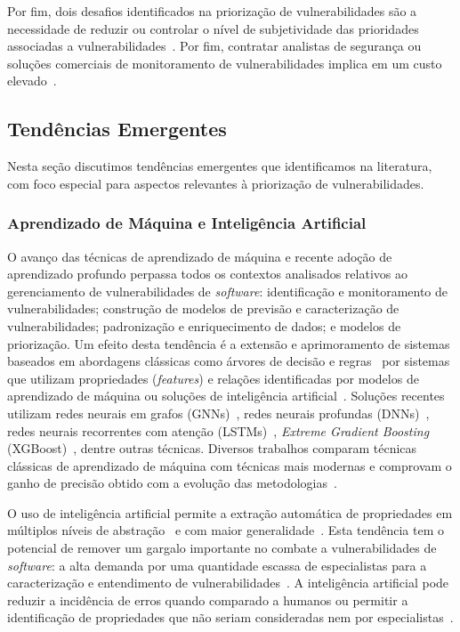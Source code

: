Por fim, dois desafios identificados na priorização de vulnerabilidades são a necessidade de reduzir ou controlar o nível de subjetividade das prioridades associadas a vulnerabilidades~\cite{stergiopoulos2018using}. Por fim, contratar analistas de segurança ou soluções comerciais de monitoramento de vulnerabilidades implica em um custo elevado~\cite{santos2024towards}.

\subsection{Tendências Emergentes}\label{sec:art.trends}

Nesta seção discutimos tendências emergentes que identificamos na literatura, com foco especial para aspectos relevantes à priorização de vulnerabilidades.

\subsubsection{Aprendizado de Máquina e Inteligência Artificial}

O avanço das técnicas de aprendizado de máquina e recente adoção de aprendizado profundo perpassa todos os contextos analisados relativos ao gerenciamento de vulnerabilidades de \emph{software}: identificação e monitoramento de vulnerabilidades; construção de modelos de previsão e caracterização de vulnerabilidades; padronização e enriquecimento de dados; e modelos de priorização. Um efeito desta tendência é a extensão e aprimoramento de sistemas baseados em abordagens clássicas como árvores de decisão e regras~\cite{coulter20cybersec, shin2010evaluating, sukhbaatar2015end} por sistemas que utilizam propriedades (\emph{features}) e relações identificadas por modelos de aprendizado de máquina ou soluções de inteligência artificial~\cite{li18vuldeepecker, ghaffarian17vulnsurvey, liu18insider}. Soluções recentes utilizam redes neurais em grafos (GNNs)~\cite{chen2019vest, chen19vase}, redes neurais profundas (DNNs)~\cite{zeng20vuln, lin20vuln}, redes neurais recorrentes com atenção (LSTMs)~\cite{gong2019joint, sahin19conceptual}, \emph{Extreme Gradient Boosting} (XGBoost)~\cite{wang19xgboost}, dentre outras técnicas. Diversos trabalhos comparam técnicas clássicas de aprendizado de máquina com técnicas mais modernas e comprovam o ganho de precisão obtido com a evolução das metodologias~\cite{anwar2021cleaning, wang19xgboost, lai2015cnn, zhuobing2017predict, zou2019mu}.

O uso de inteligência artificial permite a extração automática de propriedades em múltiplos níveis de abstração~\cite{lecun15deeplearn} e com maior generalidade~\cite{lin18vuln}. Esta tendência tem o potencial de remover um gargalo importante no combate a vulnerabilidades de \emph{software}: a alta demanda por uma quantidade escassa de especialistas para a caracterização e entendimento de vulnerabilidades~\cite{sestili18defect}. A inteligência artificial pode reduzir a incidência de erros quando comparado a humanos ou permitir a identificação de propriedades que não seriam consideradas nem por especialistas~\cite{lin21multidomain}.

